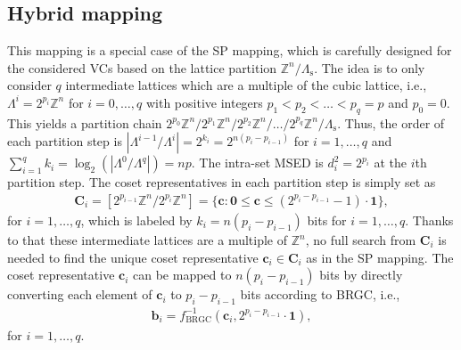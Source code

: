 \documentclass[journal]{IEEEtran}
\newcommand{\Z}{\mathbb{Z}}
\newcommand{\bb}{\boldsymbol{b}}
\newcommand{\bc}{\boldsymbol{c}}
\newcommand{\bC}{\boldsymbol{C}}
\newcommand{\bzero}{\boldsymbol{0}}
\newcommand{\bone}{\boldsymbol{1}}
\newcommand{\Lambdas}{\Lambda_\mathrm{s}}
\begin{document}
\subsection{Hybrid mapping}\label{sec:hybrid}

This mapping is a special case of the SP mapping, which is carefully designed for the considered VCs based on the lattice partition $\Z^n/\Lambdas$. The idea is to only consider $q$ intermediate lattices which are a multiple of the cubic lattice, i.e., $\Lambda^i=2^{p_i}\Z^n$ for $i=0,\ldots,q$ with positive integers ${p_1<p_2<\ldots<p_q=p}$ and $p_0=0$. This yields a partition chain $2^{p_0}\Z^n/2^{p_1}\Z^n/2^{p_2}\Z^n/\dots/2^{p_q}\Z^n/\Lambdas$. Thus, the order of each partition step is $|\Lambda^{i-1}/\Lambda^i|=2^{k_i}=2^{n(p_i-p_{i-1})}$ for $i=1,\ldots,q$ and $\sum_{i=1}^q k_i= \log_2(|\Lambda^0/\Lambda^q|)=np$. The intra-set MSED is $d_i^2=2^{p_i}$ at the $i$th partition step. The coset representatives in each partition step is simply set as  
\begin{align}
    \bC_i=[2^{p_{i-1}}\Z^n/2^{p_i}\Z^n]=\{\bc: \bzero \leq \bc \leq (2^{p_{i}-p_{i-1}}-1)\cdot\bone\},\label{eq:coset_reps}
\end{align}
for $i=1,\ldots,q$, which is labeled by $k_i=n(p_i-p_{i-1})$ bits for $i=1,\ldots,q$. Thanks to that these intermediate lattices are a multiple of $\Z^n$, no full search from $\bC_i$ is needed to find the unique coset representative $\bc_i \in \bC_i$ as in the SP mapping. The coset representative $\bc_i$ can be mapped to $n(p_i-p_{i-1})$ bits by directly converting each element of $\bc_i$ to $p_i-p_{i-1}$ bits according to BRGC, i.e.,
\begin{align}
    \bb_i=f^{-1}_{\text{BRGC}}(\bc_i,2^{p_i-p_{i-1}}\cdot\bone),\label{eq:c2b}
\end{align}
for $i=1,\ldots,q$. 
\end{document}
